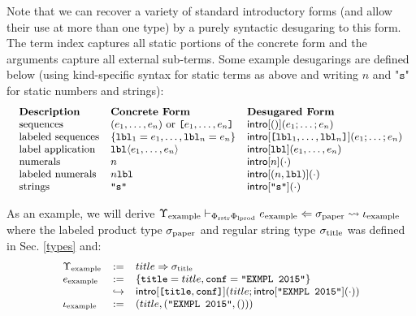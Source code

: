 \documentclass{llncs}
\begin{document}
Note that we can recover a variety of standard introductory forms (and allow their use at more than one type) by a purely syntactic desugaring to this form. The term index captures all static portions of the concrete form and the arguments capture all external sub-terms. Some example desugarings are defined below (using kind-specific syntax for static terms as above and writing $n$ and $\texttt{"s"}$ for static numbers and strings):
\[\small
\begin{array}{lll}
\textbf{Description} ~~~~& \textbf{Concrete Form}~~~~ & \textbf{Desugared Form}\\
\text{sequences} & (e_1, \ldots, e_n) ~\text{or}~ \texttt{[}e_1, \ldots, e_n\texttt{]} & \eintro{()}{e_1; \ldots; e_n}\\
\text{labeled sequences} & \{\mathtt{lbl}_1=e_1, \ldots, \mathtt{lbl}_n=e_n\} & \eintro{\texttt{[}\mathtt{lbl}_1, \ldots, \mathtt{lbl}_n\texttt{]}}{e_1; \ldots; e_n}\\
\text{label application} & \mathtt{lbl}\langle e_1, \ldots, e_n \rangle & \eintro{\mathtt{lbl}}{e_1, \ldots, e_n}\\
\text{numerals} & n & \eintro{n}{\cdot}\\
\text{labeled numerals} & n\texttt{lbl} & \eintro{(n, \texttt{lbl})}{\cdot}\\
\text{strings} & \texttt{"s"} & \eintro{\texttt{"s"}}{\cdot}
\end{array}
\]

As an example, we will derive $\small\eana{\Upsilon_\text{example}}{\Phi_\text{rstr}\Phi_\text{lprod}}{e_\text{example}}{\stx{paper}}{\iota_\text{example}}$ where the labeled product type $\sigma_\text{paper}$ and regular string type $\sigma_\text{title}$ was defined in Sec. \ref{types} and:\[\small\begin{array}{lcl}
\Upsilon_\text{example} & := & title \Rightarrow \stx{title}\\
e_\text{example} & := & \{\conclbl{title}=title, \conclbl{conf}=\texttt{"EXMPL 2015"}\}\\
& \hookrightarrow & \eintro{\texttt{[}\conclbl{title}, \conclbl{conf}\texttt{]}}{title; \eintro{\texttt{"EXMPL 2015"}}{\cdot}}\\
\iota_\text{example} & := & (title, (\texttt{"EXMPL 2015"}, ()))
\end{array}
\]
\end{document}
